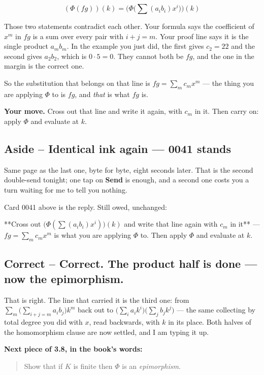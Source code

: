 \documentclass[11pt]{article}
\begin{document}
$$(\Phi(fg))(k) = \Big(\Phi\big(\textstyle\sum (a_i b_i)x^i\big)\Big)(k)$$

Those two statements contradict each other. Your formula says the coefficient of
$x^m$ in $fg$ is a sum over every pair with $i+j=m$. Your proof line says it is
the single product $a_mb_m$. In the example you just did, the first gives
$c_2 = 22$ and the second gives $a_2b_2$, which is $0 \cdot 5 = 0$. They cannot
both be $fg$, and the one in the margin is the correct one.

So the substitution that belongs on that line is $fg = \sum_m c_m x^m$ --- the
thing you are applying $\Phi$ to is $fg$, and \emph{that} is what $fg$ is.

\textbf{Your move.} Cross out that line and write it again, with $c_m$ in it. Then
carry on: apply $\Phi$ and evaluate at $k$.


\subsection*{Aside -- Identical ink again --- 0041 stands}
Same page as the last one, byte for byte, eight seconds later. That is the
second double-send tonight; one tap on \textbf{Send} is enough, and a second one
costs you a turn waiting for me to tell you nothing.

Card 0041 above is the reply. Still owed, unchanged:

**Cross out $\big(\Phi(\sum (a_ib_i)x^i)\big)(k)$ and write that line again with
$c_m$ in it** --- $fg = \sum_m c_m x^m$ is what you are applying $\Phi$ to. Then
apply $\Phi$ and evaluate at $k$.


\subsection*{Correct -- Correct. The product half is done --- now the epimorphism.}
That is right. The line that carried it is the third one: from
$\sum_m \bigl(\sum_{i+j=m} a_i b_j\bigr) k^m$ back out to
$\bigl(\sum_i a_i k^i\bigr)\bigl(\sum_j b_j k^j\bigr)$ --- the same collecting by
total degree you did with $x$, read backwards, with $k$ in its place. Both
halves of the homomorphism clause are now settled, and I am typing it up.

\textbf{Next piece of 3.8, in the book's words:}

\begin{quote}
Show that if $K$ is finite then $\Phi$ is an \emph{epimorphism}.
\end{quote}
\end{document}
